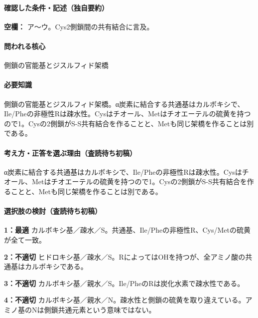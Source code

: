 \paragraph{確認した条件・記述（独自要約）}\mbox{}\par

\noindent\textbf{空欄：} ア〜ウ。Cys2側鎖間の共有結合に言及。\par

\paragraph{問われる核心} 側鎖の官能基とジスルフィド架橋

\paragraph{必要知識} 側鎖の官能基とジスルフィド架橋。α炭素に結合する共通基はカルボキシで、Ile/Pheの非極性Rは疎水性。Cysはチオール、Metはチオエーテルの硫黄を持つので1。Cysの2側鎖がS-S共有結合を作ることと、Metも同じ架橋を作ることは別である。

\paragraph{考え方・正答を選ぶ理由（査読待ち初稿）} α炭素に結合する共通基はカルボキシで、Ile/Pheの非極性Rは疎水性。Cysはチオール、Metはチオエーテルの硫黄を持つので1。Cysの2側鎖がS-S共有結合を作ることと、Metも同じ架橋を作ることは別である。

\paragraph{選択肢の検討（査読待ち初稿）}\mbox{}\par

\noindent\textbf{1：最適} カルボキシ基／疎水／S。共通基、Ile/Pheの非極性R、Cys/Metの硫黄が全て一致。\par

\noindent\textbf{2：不適切} ヒドロキシ基／疎水／S。RによってはOHを持つが、全アミノ酸の共通基はカルボキシである。\par

\noindent\textbf{3：不適切} カルボキシ基／親水／S。Ile/PheのRは炭化水素で疎水性である。\par

\noindent\textbf{4：不適切} カルボキシ基／親水／N。疎水性と側鎖の硫黄を取り違えている。アミノ基のNは側鎖共通元素という意味ではない。\par

